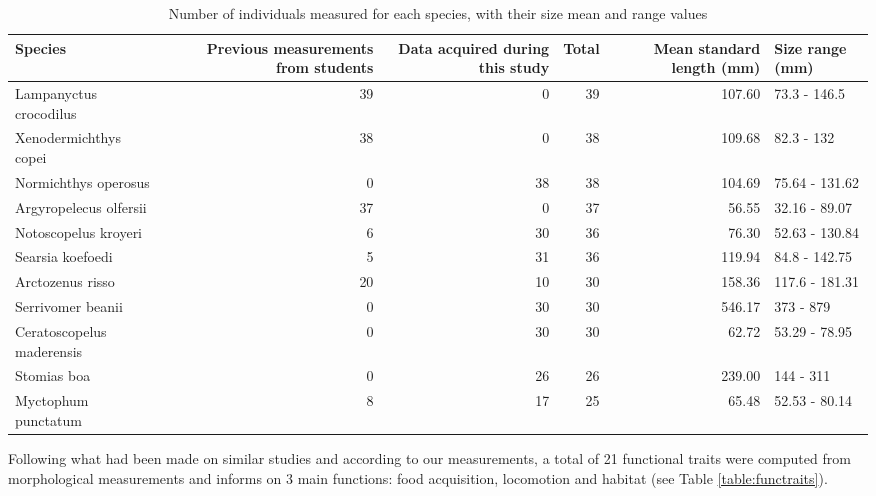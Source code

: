 \begin{table}[ht]
\centering
\label{table:spcount}
\caption{Number of individuals measured for each species, with their size mean and range values}
\begin{adjustbox}{max width=1.1\textwidth,center}
\begin{tabular}{lrrr|rl}
  \hline
Species & Previous measurements from students & Data acquired during this study & Total & Mean standard length (mm) & Size range (mm) \\ 
  \hline
Lampanyctus crocodilus &  39 &   0 &  39 & 107.60 & 73.3 - 146.5 \\ 
  Xenodermichthys copei &  38 &   0 &  38 & 109.68 & 82.3 - 132 \\ 
  Normichthys operosus &   0 &  38 &  38 & 104.69 & 75.64 - 131.62 \\ 
  Argyropelecus olfersii &  37 &   0 &  37 & 56.55 & 32.16 - 89.07 \\ 
  Notoscopelus kroyeri &   6 &  30 &  36 & 76.30 & 52.63 - 130.84 \\ 
  Searsia koefoedi &   5 &  31 &  36 & 119.94 & 84.8 - 142.75 \\ 
  Arctozenus risso &  20 &  10 &  30 & 158.36 & 117.6 - 181.31 \\ 
  Serrivomer beanii &   0 &  30 &  30 & 546.17 & 373 - 879 \\ 
  Ceratoscopelus maderensis &   0 &  30 &  30 & 62.72 & 53.29 - 78.95 \\ 
  Stomias boa &   0 &  26 &  26 & 239.00 & 144 - 311 \\ 
  Myctophum punctatum &   8 &  17 &  25 & 65.48 & 52.53 - 80.14 \\ 
   \hline
\end{tabular}
\end{adjustbox}
\end{table}


Following what had been made on similar studies and according to our measurements, a total of 21 functional traits were computed from morphological measurements and informs on 3 main functions: food acquisition, locomotion and habitat (see Table \ref{table:functraits}).


